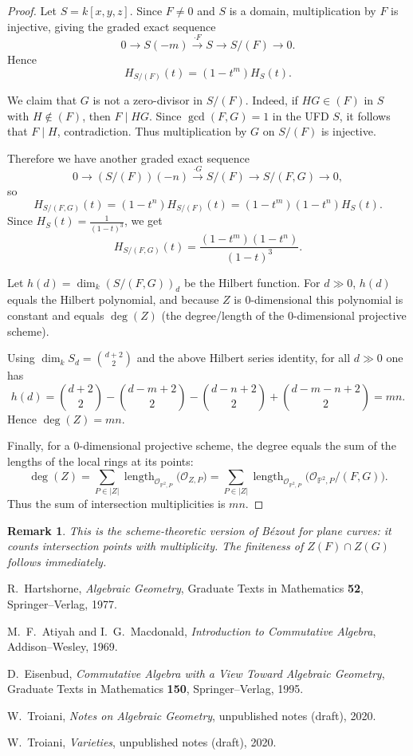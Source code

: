 \documentclass[12pt]{article}
\numberwithin{thm}{subsection}
\numberwithin{defn}{subsection}
\numberwithin{lemma}{subsection}
\numberwithin{example}{subsection}
\numberwithin{notation}{subsection}
\numberwithin{cor}{subsection}
\newtheorem{remark}{Remark}
\numberwithin{remark}{subsection}
\numberwithin{condition}{subsection}
\numberwithin{question}{subsection}
\numberwithin{construction}{subsection}
\numberwithin{construction}{subsection}
\numberwithin{construction}{subsection}
\newcommand{\bb}[1]{\mathbb{#1}}
\begin{document}
\begin{proof}
Let $S=k[x,y,z]$.
Since $F\neq 0$ and $S$ is a domain, multiplication by $F$ is injective, giving the graded exact sequence
\[
0\to S(-m)\xrightarrow{\cdot F} S \to S/(F)\to 0.
\]
Hence
\[
H_{S/(F)}(t)=(1-t^m)H_S(t).
\]

We claim that $G$ is not a zero-divisor in $S/(F)$.
Indeed, if $HG\in (F)$ in $S$ with $H\notin (F)$, then $F\mid HG$.
Since $\gcd(F,G)=1$ in the UFD $S$, it follows that $F\mid H$, contradiction. Thus multiplication by $G$ on $S/(F)$ is injective.

Therefore we have another graded exact sequence
\[
0\to (S/(F))(-n)\xrightarrow{\cdot G} S/(F) \to S/(F,G)\to 0,
\]
so
\[
H_{S/(F,G)}(t)=(1-t^n)H_{S/(F)}(t)=(1-t^m)(1-t^n)H_S(t).
\]
Since $H_S(t)=\frac{1}{(1-t)^3}$, we get
\[
H_{S/(F,G)}(t)=\frac{(1-t^m)(1-t^n)}{(1-t)^3}.
\]

Let $h(d)=\dim_k (S/(F,G))_d$ be the Hilbert function.
For $d\gg 0$, $h(d)$ equals the Hilbert polynomial, and because $Z$ is $0$-dimensional this polynomial is constant
and equals $\deg(Z)$ (the degree/length of the $0$-dimensional projective scheme).

Using $\dim_k S_d=\binom{d+2}{2}$ and the above Hilbert series identity, for all $d\gg 0$ one has
\[
h(d)=\binom{d+2}{2}-\binom{d-m+2}{2}-\binom{d-n+2}{2}+\binom{d-m-n+2}{2}=mn.
\]
Hence $\deg(Z)=mn$.

Finally, for a $0$-dimensional projective scheme, the degree equals the sum of the lengths of the local rings at its points:
\[
\deg(Z)=\sum_{P\in |Z|}\operatorname{length}_{\mathcal{O}_{\bb{P}^2,P}}\big(\mathcal{O}_{Z,P}\big)
=\sum_{P\in |Z|}\operatorname{length}_{\mathcal{O}_{\bb{P}^2,P}}\big(\mathcal{O}_{\bb{P}^2,P}/(F,G)\big).
\]
Thus the sum of intersection multiplicities is $mn$.
\end{proof}

\begin{remark}
This is the scheme-theoretic version of B\'ezout for plane curves:
it counts intersection points with multiplicity. The finiteness of $Z(F)\cap Z(G)$ follows immediately.
\end{remark}

\begin{thebibliography}{99}

R.~Hartshorne,
\emph{Algebraic Geometry},
Graduate Texts in Mathematics \textbf{52},
Springer--Verlag, 1977.

M.~F.~Atiyah and I.~G.~Macdonald,
\emph{Introduction to Commutative Algebra},
Addison--Wesley, 1969.

D.~Eisenbud,
\emph{Commutative Algebra with a View Toward Algebraic Geometry},
Graduate Texts in Mathematics \textbf{150},
Springer--Verlag, 1995.

W.~Troiani,
\emph{Notes on Algebraic Geometry},
unpublished notes (draft), 2020.

W.~Troiani,
\emph{Varieties},
unpublished notes (draft), 2020.

\end{thebibliography}
\end{document}
